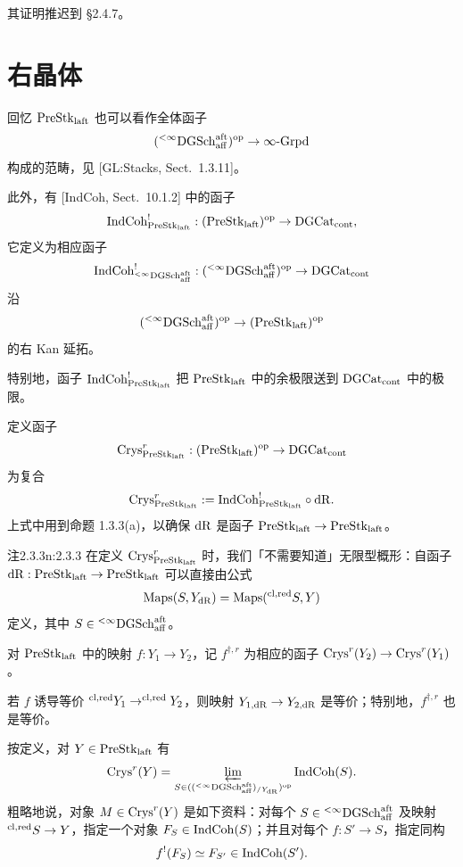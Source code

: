 其证明推迟到 §2.4.7。

\section{右晶体}

回忆 $\mathrm{PreStk}_{\mathrm{laft}}$ 也可以看作全体函子
\[
({}^{<\infty}\mathrm{DGSch}_{\mathrm{aff}}^{\mathrm{aft}})^{\mathrm{op}}\to\infty\text{-}\mathrm{Grpd}
\]
构成的范畴，见 [GL:Stacks, Sect.~1.3.11]。

此外，有 [IndCoh, Sect.~10.1.2] 中的函子
\[
\mathrm{IndCoh}^!_{\mathrm{PreStk}_{\mathrm{laft}}}:(\mathrm{PreStk}_{\mathrm{laft}})^{\mathrm{op}}\to\mathrm{DGCat}_{\mathrm{cont}},
\]
它定义为相应函子
\[
\mathrm{IndCoh}^!_{{}^{<\infty}\mathrm{DGSch}_{\mathrm{aff}}^{\mathrm{aft}}}:({}^{<\infty}\mathrm{DGSch}_{\mathrm{aff}}^{\mathrm{aft}})^{\mathrm{op}}\to\mathrm{DGCat}_{\mathrm{cont}}
\]
沿
\[
({}^{<\infty}\mathrm{DGSch}_{\mathrm{aff}}^{\mathrm{aft}})^{\mathrm{op}}\to(\mathrm{PreStk}_{\mathrm{laft}})^{\mathrm{op}}
\]
的右 Kan 延拓。

特别地，函子 $\mathrm{IndCoh}^!_{\mathrm{PreStk}_{\mathrm{laft}}}$ 把 $\mathrm{PreStk}_{\mathrm{laft}}$ 中的余极限送到 $\mathrm{DGCat}_{\mathrm{cont}}$ 中的极限。

定义函子
\[
\mathrm{Crys}^r_{\mathrm{PreStk}_{\mathrm{laft}}}:(\mathrm{PreStk}_{\mathrm{laft}})^{\mathrm{op}}\to\mathrm{DGCat}_{\mathrm{cont}}
\]
为复合
\[
\mathrm{Crys}^r_{\mathrm{PreStk}_{\mathrm{laft}}}:=\mathrm{IndCoh}^!_{\mathrm{PreStk}_{\mathrm{laft}}}\circ\mathrm{dR}.
\]
上式中用到命题 1.3.3(a)，以确保 $\mathrm{dR}$ 是函子 $\mathrm{PreStk}_{\mathrm{laft}}\to\mathrm{PreStk}_{\mathrm{laft}}$。

\begin{othm}{注}{2.3.3}{n:2.3.3}
在定义 $\mathrm{Crys}^r_{\mathrm{PreStk}_{\mathrm{laft}}}$ 时，我们「不需要知道」无限型概形：自函子 $\mathrm{dR}:\mathrm{PreStk}_{\mathrm{laft}}\to\mathrm{PreStk}_{\mathrm{laft}}$ 可以直接由公式
\[
\mathrm{Maps}(S,Y_{\mathrm{dR}})=\mathrm{Maps}(^{\mathrm{cl,red}} S,Y)
\]
定义，其中 $S\in{}^{<\infty}\mathrm{DGSch}_{\mathrm{aff}}^{\mathrm{aft}}$。
\end{othm}

对 $\mathrm{PreStk}_{\mathrm{laft}}$ 中的映射 $f:Y_1\to Y_2$，记 $f^{\dagger,r}$ 为相应的函子 $\mathrm{Crys}^r(Y_2)\to\mathrm{Crys}^r(Y_1)$。

若 $f$ 诱导等价 $^{\mathrm{cl,red}} Y_1\to^{\mathrm{cl,red}} Y_2$，则映射 $Y_{1,\mathrm{dR}}\to Y_{2,\mathrm{dR}}$ 是等价；特别地，$f^{\dagger,r}$ 也是等价。

按定义，对 $Y\in\mathrm{PreStk}_{\mathrm{laft}}$ 有
\[
\mathrm{Crys}^r(Y)=\varprojlim_{S\in(({}^{<\infty}\mathrm{DGSch}_{\mathrm{aff}}^{\mathrm{aft}})_{/Y_{\mathrm{dR}}})^{\mathrm{op}}}\mathrm{IndCoh}(S).
\]
粗略地说，对象 $M\in\mathrm{Crys}^r(Y)$ 是如下资料：对每个 $S\in{}^{<\infty}\mathrm{DGSch}_{\mathrm{aff}}^{\mathrm{aft}}$ 及映射 $^{\mathrm{cl,red}} S\to Y$，指定一个对象 $F_S\in\mathrm{IndCoh}(S)$；并且对每个 $f:S'\to S$，指定同构
\[
f^!(F_S)\simeq F_{S'}\in\mathrm{IndCoh}(S').
\]

